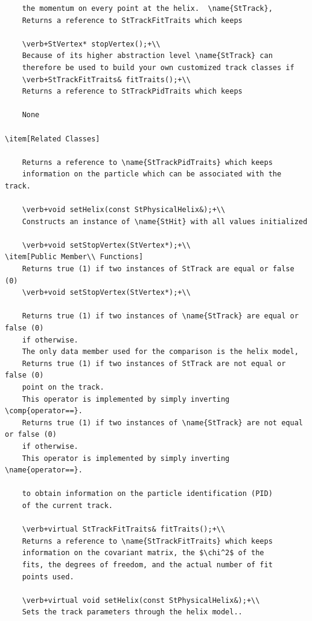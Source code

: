 \begin{Entry}
\begin{Entry}
{\begin{verbatim}
    the momentum on every point at the helix.  \name{StTrack},
    Returns a reference to StTrackFitTraits which keeps
    
    \verb+StVertex* stopVertex();+\\
    Because of its higher abstraction level \name{StTrack} can
    therefore be used to build your own customized track classes if
    \verb+StTrackFitTraits& fitTraits();+\\
    Returns a reference to StTrackPidTraits which keeps
    
    None
    
\item[Related Classes]
    
    Returns a reference to \name{StTrackPidTraits} which keeps
    information on the particle which can be associated with the track.
    
    \verb+void setHelix(const StPhysicalHelix&);+\\
    Constructs an instance of \name{StHit} with all values initialized
    
    \verb+void setStopVertex(StVertex*);+\\            
\item[Public Member\\ Functions]
    Returns true (1) if two instances of StTrack are equal or false (0)
    \verb+void setStopVertex(StVertex*);+\\

    Returns true (1) if two instances of \name{StTrack} are equal or false (0)
    if otherwise.
    The only data member used for the comparison is the helix model,
    Returns true (1) if two instances of StTrack are not equal or false (0)
    point on the track.
    This operator is implemented by simply inverting \comp{operator==}.
    Returns true (1) if two instances of \name{StTrack} are not equal or false (0)
    if otherwise. 
    This operator is implemented by simply inverting \name{operator==}.
            
    to obtain information on the particle identification (PID)
    of the current track.

    \verb+virtual StTrackFitTraits& fitTraits();+\\
    Returns a reference to \name{StTrackFitTraits} which keeps
    information on the covariant matrix, the $\chi^2$ of the
    fits, the degrees of freedom, and the actual number of fit
    points used.

    \verb+virtual void setHelix(const StPhysicalHelix&);+\\
    Sets the track parameters through the helix model..


\end{verbatim}}
\end{Entry}
\end{Entry}
